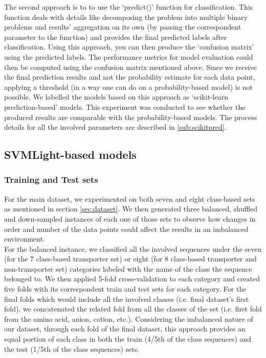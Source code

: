     The second approach is to to use the `predict()' function for classification. This function deals with details like 
    decomposing the problem into multiple binary problems and results' aggregation on its own (by passing the 
    correspondent parameter to the function) and provides the final predicted labels after classification. 
    Using this approach, you can then produce the `confusion matrix' using the predicted labels. 
    The performance metrics for model evaluation could then be computed using the confusion matrix mentioned above. 
    Since we receive the final prediction results and not the probability estimate for each data point, applying  
    a threshold (in a way one can do on a probability-based model) is not possible.
    We labelled the models based on this approach as `scikit-learn prediction-based' models. This experiment was 
    conducted to see whether the produced results are comparable with the probability-based models. The process details 
    for all the involved parameters are described in \ref{sub:scikitpred}.\\ 
    

\subsection{SVMLight-based models}
\label{sub:svmmodels}

    \subsubsection{Training and Test sets}
    \label{sec:svmttraintest}
    For the main dataset, we experimented on both seven and eight class-based sets as mentioned in section \ref{sec:dataset}.
    We then generated three balanced, shuffled and down-sampled instances of each one of those sets
    to observe how changes in order and number of the data points could affect the results in an imbalanced environment.\\

    For the balanced instance, we classified all the involved sequences under the seven (for the 7 class-based transporter set)
    or eight (for 8 class-based transporter and non-transporter set) categories labeled with the name of the class the sequence 
    belonged to. We then applied 5-fold cross-validation to each category and 
    created five folds with its correspondent train and test sets for each category. For the final folds which would include
    all the involved classes (i.e. final dataset's first fold), we concatenated the related fold from all the classes of the set 
    (i.e. first fold from the amino acid, anion, cation, etc.). Considering the imbalanced nature of our dataset, 
    through each fold of the final dataset, this approach provides an equal portion of each class in both the train 
    (4/5th of the class sequences) and the test (1/5th of the class sequences) sets.\\

